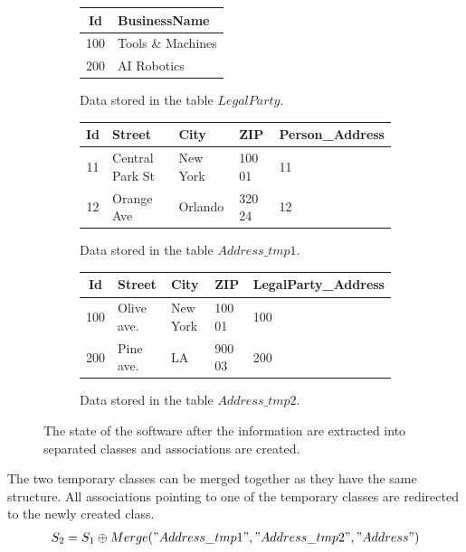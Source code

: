 \documentclass[11pt]{article}
\begin{document}
\begin{figure}
\begin{subfigure}[b]{0.5\textwidth}
\begin{tabular}{| c | l |}
	 	\hline
		Id &  BusinessName  \\ \hline  
		100 & Tools \& Machines  \\ \hline
		200 & AI Robotics \\ \hline
	\end{tabular}
	\caption{Data stored in the table $LegalParty$.}
\end{subfigure}
\begin{subfigure}[b]{\textwidth}
	\centering
	\begin{tabular}{| c | l | l | l | l |}
	 	\hline
		Id & Street & City & ZIP & Person\_Address \\ \hline  
		11 & Central Park St & New York & 100 01 & 11  \\ \hline
		12 & Orange Ave & Orlando & 320 24 & 12 \\ \hline
	\end{tabular}
	\caption{Data stored in the table $Address\_tmp1$.}
\end{subfigure}
\begin{subfigure}[b]{\textwidth}
	\centering
	\begin{tabular}{| c | l | l | l | l |}
	 	\hline
		Id & Street & City & ZIP & LegalParty\_Address\\ \hline  
		100 & Olive ave. & New York & 100 01 & 100 \\ \hline
		200 & Pine ave. & LA & 900 03 & 200  \\ \hline
	\end{tabular}
	\caption{Data stored in the table $Address\_tmp2$.}
\end{subfigure}


	\caption{The state of the software after the information are extracted into separated classes and associations are created.}
	\label{fig:case2}
\end{figure}
The two temporary classes can be merged together as they have the same structure. All associations pointing to one of the temporary classes are redirected to the newly created class.
\begin{align*}
%
%
S_2 &= S_1 \oplus Merge("Address\_tmp1", "Address\_tmp2", "Address") \\
\end{align*}
\end{document}
